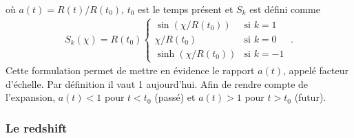 où $a(t) = R(t) / R(t_0)$,  $t_0$ est le temps présent et $S_{k}$ est défini comme
\begin{align}
  S_{k}(\chi) = R(t_0) \left\{
    \begin{array}{ll}
      \sin(\chi / R(t_0)) & \mbox{si } k = 1 \\
      \chi / R(t_0) & \textrm{si } k = 0 \\
      \sinh(\chi / R(t_0)) & \mbox{si } k = -1
    \end{array}
\right.  \; .
\end{align}
Cette formulation permet de mettre en évidence le rapport $a(t)$, appelé facteur d'échelle. Par définition il vaut 1 aujourd'hui. Afin de rendre compte de l'expansion, $a(t) < 1$ pour $t < t_0$ (passé) et $a(t) > 1$ pour $t > t_0$ (futur).

\subsubsection{Le redshift}
\label{par:redshift}


